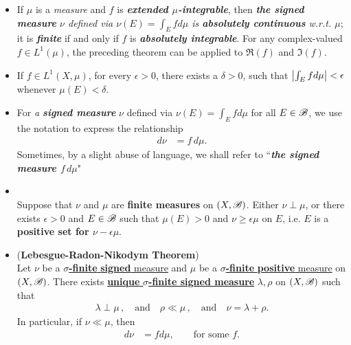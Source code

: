 \documentclass[11pt]{article}
\begin{document}
\begin{itemize}
\item \begin{remark}
 If $\mu$ is a \emph{measure} and $f$ is \emph{\textbf{extended $\mu$-integrable}}, then \emph{\textbf{the signed measure} $\nu$ defined via $\nu(E) = \int_{E}f d\mu$ is \textbf{absolutely continuous} w.r.t. $\mu$}; it is \emph{\textbf{finite}} if and only if $f$ is \emph{\textbf{absolutely integrable}}.  For any complex-valued $f \in L^1(\mu)$, the preceding theorem can be applied to $\Re(f)$ and $\Im(f)$.
 \end{remark}
 
 \item \begin{corollary}
If $f\in L^{1}(X, \mu)$, for every $\epsilon>0$, there exists a $\delta>0$, such that $\left\lvert \int_{E}f d\mu  \right\rvert<\epsilon$ whenever $\mu(E)<\delta$.
\end{corollary}
 
\item \begin{definition} 
For \emph{a \textbf{signed measure}}  $\nu$ defined via $\nu(E) = \int_{E}f d\mu$ for all $E \in {\mathscr B}$, we use the notation to express the relationship
 \begin{align*}
d\nu &= f\, d\mu.
\end{align*} Sometimes, by a slight abuse of language, we shall refer to ``\emph{\textbf{the signed measure $f\, d\mu$}}" 
\end{definition} 
 
\item \begin{lemma}\citep{folland2013real}\\
Suppose that $\nu$ and $\mu$ are \textbf{finite measures} on $(X,{\mathscr B})$. Either $\nu \perp \mu$, or there exists $\epsilon>0$ and $E\in {\mathscr B}$ such that  $\mu(E)>0$ and $\nu \ge \epsilon \mu$ on $E$, i.e. $E$ is a \textbf{positive set for $\nu-\epsilon \mu$}. 
\end{lemma}

\item \begin{theorem}(\textbf{Lebesgue-Radon-Nikodym Theorem})\citep{folland2013real}\\
Let $\nu$ be a \underline{\textbf{$\sigma$-finite} \textbf{signed} measure} and $\mu$ be a \underline{\textbf{$\sigma$-finite} \textbf{positive} measure} on $(X,{\mathscr B})$. There exists \underline{\textbf{unique} \textbf{$\sigma$-finite signed measure}} $\lambda, \rho$ on $(X,{\mathscr B})$ such that 
\begin{align*}
\lambda \perp \mu\,, \quad \text{and} \quad \rho \ll \mu\,, \quad \text{and} \quad  \nu= \lambda+ \rho.
\end{align*} 
In particular, if $\nu \ll \mu$, then 
\begin{align*}
d\nu &= f d\mu, \qquad \text{for some }f.
\end{align*} 
\end{theorem}


\end{itemize}
\end{document}
